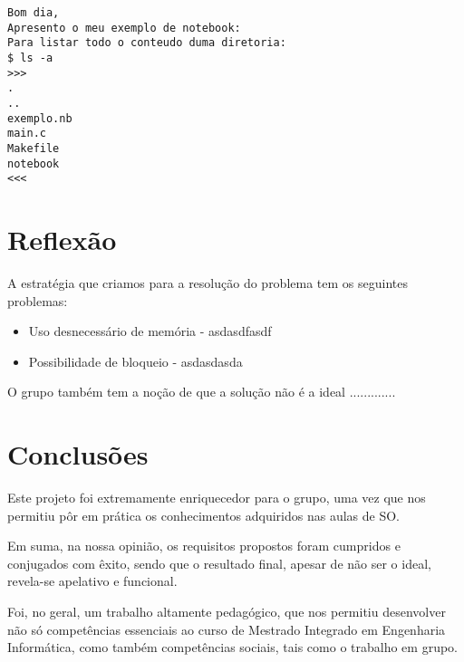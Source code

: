 \documentclass[a4paper]{article}
\begin{document}

\begin{lstlisting}[caption=Resultado do 3º Exemplo]
Bom dia,
Apresento o meu exemplo de notebook:
Para listar todo o conteudo duma diretoria:
$ ls -a
>>>
.
..
exemplo.nb
main.c
Makefile
notebook
<<<

\end{lstlisting}




\section{Reflexão}
\label{sec:reflexao}

A estratégia que criamos para a resolução do problema tem os seguintes problemas:

\begin{itemize}
  \item{Uso desnecessário de memória - asdasdfasdf}
  \item{Possibilidade de bloqueio - asdasdasda}
\end{itemize}

O grupo também tem a noção de que a solução não é a ideal .............


\section{Conclusões}
\label{sec:conclusao}

Este projeto foi extremamente enriquecedor para o grupo, uma vez que nos permitiu pôr em prática os conhecimentos adquiridos nas aulas de SO.

Em suma, na nossa opinião, os requisitos propostos foram cumpridos e conjugados com êxito, sendo que o resultado final, apesar de não ser o ideal, revela-se apelativo e funcional.

Foi, no geral, um trabalho  altamente pedagógico, que nos permitiu desenvolver não só competências essenciais ao curso de Mestrado Integrado em Engenharia Informática, como também competências sociais, tais como o trabalho em grupo.
\end{document}
